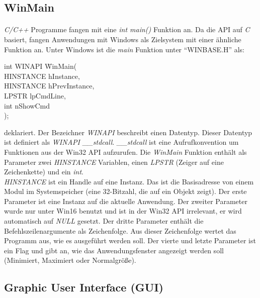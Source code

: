 \subsection{WinMain}
\paragraph{}
\textit{C/C++} Programme fangen mit eine \textit{int main()} Funktion an. Da die API auf \textit{C} basiert, fangen Anwendungen mit Windows als Zielsystem mit einer ähnliche Funktion an. Unter Windows ist die \textit{main} Funktion unter "`WINBASE.H"' als:

\begin{tabbing}

int WINAPI \=WinMain(\\
    			\>HINSTANCE hInstance,\\
    			\>HINSTANCE hPrevInstance,\\
    			\>LPSTR lpCmdLine,\\
    			\>int nShowCmd\\
			\>);
\\
\end{tabbing}

deklariert. Der Bezeichner \textit{WINAPI} beschreibt einen Datentyp. Dieser Datentyp ist definiert als \textit{WINAPI \_\_stdcall}. \textit{\_\_stdcall} ist eine Aufrufkonvention um Funktionen aus der Win32 API aufzurufen. Die \textit{WinMain} Funktion enthält als Parameter zwei \textit{HINSTANCE} Variablen, einen \textit{LPSTR} (Zeiger auf eine Zeichenkette) und ein \textit{int}.\\


\textit{HINSTANCE} ist ein Handle auf eine Instanz. Das ist die Basisadresse von einem Modul im Systemspeicher (eine 32-Bitzahl, die auf ein Objekt zeigt). Der erste Parameter ist eine Instanz auf die aktuelle Anwendung. Der zweiter Parameter wurde nur unter Win16 benutzt und ist in der Win32 API irrelevant, er wird automatisch auf \textit{NULL} gesetzt. Der dritte Parameter enthält die Befehlszeilenargumente als Zeichenfolge. Aus dieser Zeichenfolge wertet das Programm aus, wie es ausgeführt werden soll. Der vierte und letzte Parameter ist ein Flag und gibt an, wie das Anwendungsfenster angezeigt werden soll (Minimiert, Maximiert oder Normalgröße).

\subsection{Graphic User Interface (GUI)}
